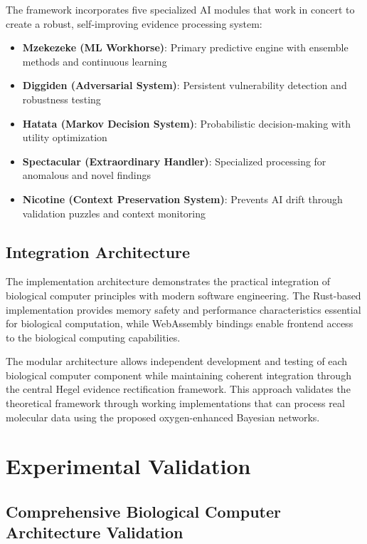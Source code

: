 \documentclass[12pt,a4paper]{article}
\begin{document}
The framework incorporates five specialized AI modules that work in concert to create a robust, self-improving evidence processing system:

\begin{itemize}
\item \textbf{Mzekezeke (ML Workhorse)}: Primary predictive engine with ensemble methods and continuous learning
\item \textbf{Diggiden (Adversarial System)}: Persistent vulnerability detection and robustness testing
\item \textbf{Hatata (Markov Decision System)}: Probabilistic decision-making with utility optimization
\item \textbf{Spectacular (Extraordinary Handler)}: Specialized processing for anomalous and novel findings
\item \textbf{Nicotine (Context Preservation System)}: Prevents AI drift through validation puzzles and context monitoring
\end{itemize}

\subsection{Integration Architecture}

The implementation architecture demonstrates the practical integration of biological computer principles with modern software engineering. The Rust-based implementation provides memory safety and performance characteristics essential for biological computation, while WebAssembly bindings enable frontend access to the biological computing capabilities.

The modular architecture allows independent development and testing of each biological computer component while maintaining coherent integration through the central Hegel evidence rectification framework. This approach validates the theoretical framework through working implementations that can process real molecular data using the proposed oxygen-enhanced Bayesian networks.

\section{Experimental Validation}

\subsection{Comprehensive Biological Computer Architecture Validation}
\end{document}
